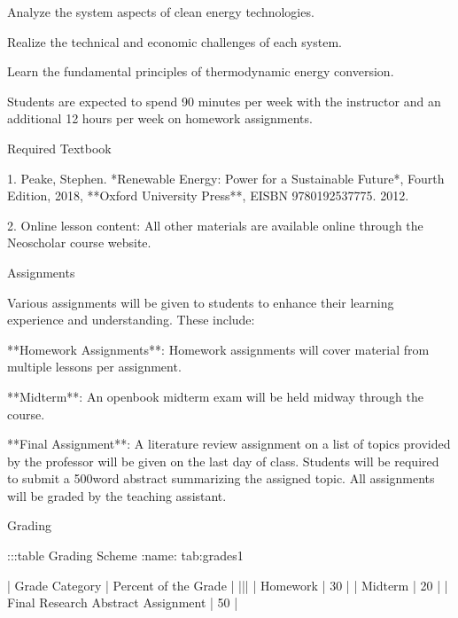 \documentclass[letterpaper,10pt,english]{jupyterBook}
\begin{document}
\begin{sphinxVerbatim}[commandchars=\\\{\}]
\PYGZhy{}   Analyze the \PYGZdq{}system\PYGZdq{} aspects of clean energy technologies.

\PYGZhy{}   Realize the technical and economic challenges of each system.

\PYGZhy{}   Learn the fundamental principles of thermodynamic energy conversion.

Students are expected to spend 90 minutes per week with the instructor
and an additional 1\PYGZhy{}2 hours per week on homework assignments.

\PYGZsh{}\PYGZsh{} Required Textbook

1.  Peake, Stephen. *Renewable Energy: Power for a Sustainable Future*,
    Fourth Edition, 2018, **Oxford University Press**, EISBN
    978\PYGZhy{}0\PYGZhy{}19\PYGZhy{}253777\PYGZhy{}5. 2012.

2.  Online lesson content: All other materials are available online
    through the Neoscholar course website.

\PYGZsh{}\PYGZsh{} Assignments

Various assignments will be given to students to enhance their learning
experience and understanding. These include:

\PYGZhy{}   **Homework Assignments**: Homework assignments will cover material
    from multiple lessons per assignment.

\PYGZhy{}   **Midterm**: An open\PYGZhy{}book midterm exam will be held midway through
    the course.

\PYGZhy{}   **Final Assignment**: A literature review assignment on a list of
    topics provided by the professor will be given on the last day of
    class. Students will be required to submit a 500\PYGZhy{}word abstract
    summarizing the assigned topic. All assignments will be graded by
    the teaching assistant.

\PYGZsh{}\PYGZsh{} Grading

:::\PYGZob{}table\PYGZcb{} Grading Scheme
:name: tab:grades1

| Grade Category                       | Percent of the Grade |
|\PYGZhy{}\PYGZhy{}\PYGZhy{}\PYGZhy{}\PYGZhy{}\PYGZhy{}\PYGZhy{}\PYGZhy{}\PYGZhy{}\PYGZhy{}\PYGZhy{}\PYGZhy{}\PYGZhy{}\PYGZhy{}\PYGZhy{}\PYGZhy{}\PYGZhy{}\PYGZhy{}\PYGZhy{}\PYGZhy{}\PYGZhy{}\PYGZhy{}\PYGZhy{}\PYGZhy{}\PYGZhy{}\PYGZhy{}\PYGZhy{}\PYGZhy{}\PYGZhy{}\PYGZhy{}\PYGZhy{}\PYGZhy{}\PYGZhy{}\PYGZhy{}\PYGZhy{}\PYGZhy{}\PYGZhy{}\PYGZhy{}|\PYGZhy{}\PYGZhy{}\PYGZhy{}\PYGZhy{}\PYGZhy{}\PYGZhy{}\PYGZhy{}\PYGZhy{}\PYGZhy{}\PYGZhy{}\PYGZhy{}\PYGZhy{}\PYGZhy{}\PYGZhy{}\PYGZhy{}\PYGZhy{}\PYGZhy{}\PYGZhy{}\PYGZhy{}\PYGZhy{}\PYGZhy{}\PYGZhy{}|
| Homework                             | 30\PYGZpc{}                 |
| Midterm                              | 20\PYGZpc{}                 |
| Final Research Abstract Assignment   | 50\PYGZpc{}                 |


\end{sphinxVerbatim}
\end{document}
